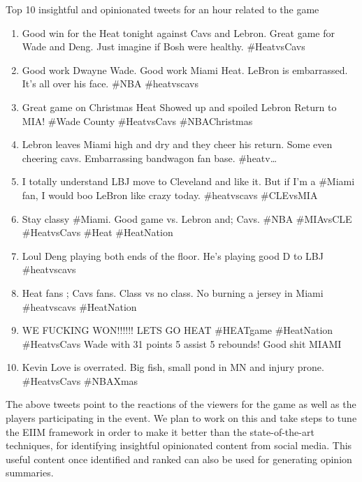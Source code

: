 Top 10 insightful and opinionated tweets for an hour related to the game
\begin{enumerate}

\item	Good win for the Heat tonight against Cavs and Lebron. Great game for Wade and Deng. Just imagine if Bosh were healthy. \#HeatvsCavs

\item	Good work Dwayne Wade. Good work Miami Heat. LeBron is embarrassed. It's all over his face. \#NBA \#heatvscavs

\item	Great game on Christmas Heat Showed up and spoiled Lebron Return to MIA! \#Wade County \#HeatvsCavs \#NBAChristmas

\item	Lebron leaves Miami high and dry and they cheer his return. Some even cheering cavs. Embarrassing bandwagon fan base. \#heatv…

\item	I totally understand LBJ move to Cleveland and like it. But if I'm a \#Miami fan, I would boo LeBron like crazy today. \#heatvscavs \#CLEvsMIA

\item	Stay classy \#Miami. Good game vs. Lebron and; Cavs. \#NBA \#MIAvsCLE \#HeatvsCavs \#Heat \#HeatNation

\item Loul Deng playing both ends of the floor. He's playing good D to LBJ \#heatvscavs

\item	Heat fans ; Cavs fans. Class vs no class. No burning a jersey in Miami \#heatvscavs \#HeatNation

\item	WE FUCKING WON!!!!!! LETS GO HEAT \#HEATgame \#HeatNation \#HeatvsCavs Wade with 31 points 5 assist 5 rebounds! Good shit MIAMI

\item	Kevin Love is overrated. Big fish, small pond in MN and injury prone. \#HeatvsCavs \#NBAXmas

\end{enumerate}

The above tweets point to the reactions of the viewers for the game as well as the players participating in the event. We plan to work on this and take steps to tune the EIIM framework in order to make it better than the state-of-the-art techniques, for identifying insightful opinionated content from social media. This useful content once identified and ranked can also be used for generating opinion summaries. 







